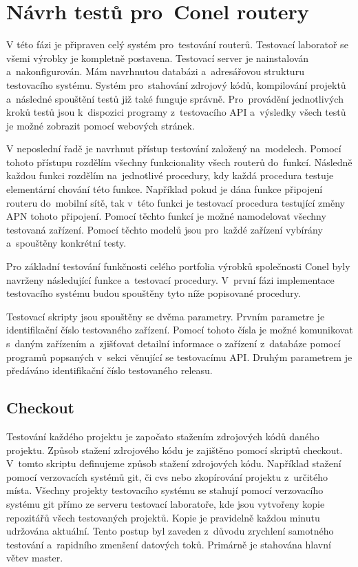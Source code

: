 \chapter{Návrh testů pro~Conel routery}
V této fázi je připraven celý systém pro~testování routerů. Testovací laboratoř se všemi výrobky je kompletně postavena. Testovací server je nainstalován a~nakonfigurován. Mám navrhnutou databázi a~adresářovou strukturu testovacího systému. Systém pro~stahování zdrojový kódů, kompilování projektů a~následné spouštění testů již také funguje správně. Pro~provádění jednotlivých kroků testů jsou k~dispozici programy z~testovacího API a~výsledky všech testů je možné zobrazit pomocí webových stránek.

V neposlední řadě je navrhnut přístup testování založený na~modelech. Pomocí tohoto přístupu rozdělím všechny funkcionality všech routerů do~funkcí. Následně každou funkci rozdělím na~jednotlivé procedury, kdy každá procedura testuje elementární chování této funkce. Například pokud je dána funkce připojení routeru do~mobilní sítě, tak v~této funkci je testovací procedura testující změny APN tohoto připojení. Pomocí těchto funkcí je možné namodelovat všechny testovaná zařízení. Pomocí těchto modelů jsou pro~každé zařízení vybírány a~spouštěny konkrétní testy.

Pro základní testování funkčnosti celého portfolia výrobků společnosti Conel byly navrženy následující funkce a~testovací procedury. V~první fázi implementace testovacího systému budou spouštěny tyto níže popisované procedury.

Testovací skripty jsou spouštěny se dvěma parametry. Prvním parametre je identifikační číslo testovaného zařízení. Pomocí tohoto čísla je možné komunikovat s~daným zařízením a~zjišťovat detailní informace o zařízení z~databáze pomocí programů popsaných v~sekci věnující se testovacímu API. Druhým parametrem je předáváno identifikační číslo testovaného releasu.

\section{Checkout}
Testování každého projektu je započato stažením zdrojových kódů daného projektu. Způsob stažení zdrojového kódu je zajištěno pomocí skriptů checkout. V~tomto skriptu definujeme způsob stažení zdrojových kódu. Například stažení pomocí verzovacích systémů git, či cvs nebo zkopírování projektu z~určitého místa. Všechny projekty testovacího systému se stahují pomocí verzovacího systému git přímo ze serveru testovací laboratoře, kde jsou vytvořeny kopie repozitářů všech testovaných projektů. Kopie je pravidelně každou minutu udržována aktuální. Tento postup byl zaveden z~důvodu zrychlení samotného testování a~rapidního zmenšení datových toků. Primárně je stahována hlavní větev master.

